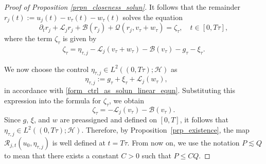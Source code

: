 \documentclass[10pt, reqno]{amsart}
\numberwithin{equation}{section}
\begin{document}
\begin{proof}[Proof of Proposition \ref{prpn_closeness_solun}]
It follows that the remainder \( r_j(t) := u_j(t) - v_{\tau}(t) - w_{\tau}(t) \) solves the equation
\begin{equation}\label{equn_r}
	\partial_t r_j + \mathcal{L}_j r_j + \mathcal{B}(r_j) + \mathcal{Q}(r_j, v_{\tau} + w_{\tau}) = \zeta_{\tau}, \quad t \in [0, T\tau],
\end{equation}
where the term \( \zeta_{\tau} \) is given by
\begin{align*}
	\zeta_{\tau} = \eta_{\tau, j} - \mathcal{L}_j(v_{\tau} + w_{\tau}) - \mathcal{B}(v_{\tau}) - g_{\tau} - \xi_{\tau}.
\end{align*}

We now choose the control \( \eta_{\tau, j} \in L^2((0, T\tau); \mathcal{H}) \) as
\begin{equation}\label{choice_of_control}
	\eta_{\tau, j} := g_{\tau} + \xi_{\tau} + \mathcal{L}_j(w_{\tau}), \qquad 
\end{equation}
in accordance with \eqref{form_ctrl_as_solun_linear_equn}. Substituting this expression into the formula for \( \zeta_{\tau} \), we obtain
\begin{equation}\label{source_term_zeta}
	\zeta_{\tau} = -\mathcal{L}_j(v_{\tau}) - \mathcal{B}(v_{\tau}).
\end{equation}
Since $g$, $\xi$, and $w$ are preassigned and defined on $[0,T]$, it follows that $\eta_{\tau,j} \in L^2((0,T\tau);\mathcal{H})$. Therefore, by Proposition~\ref{prp_existence}, 
the map $\mathcal{R}_{j,t}(u_0,\eta_{\tau,j})$ is well defined at $t = T\tau$. 
From now on, we use the notation $P \lesssim Q$ to mean that there exists a constant $C>0$ such that $P \le C Q$.



\end{proof}
\end{document}
